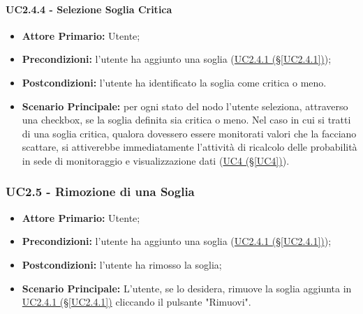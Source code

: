 \paragraph{UC2.4.4 - Selezione Soglia Critica}\label{UC2.4.4}
\begin{itemize}
	\item \textbf{Attore Primario:} Utente;
	\item \textbf{Precondizioni:} l'utente ha aggiunto una soglia (\hyperref[UC2.4.1]{UC2.4.1 (§\ref*{UC2.4.1})});
	\item \textbf{Postcondizioni:} l'utente ha identificato la soglia come critica o meno.
	\item \textbf{Scenario Principale:} per ogni stato del nodo l'utente seleziona, attraverso una checkbox\glossario, se la soglia definita sia critica o meno. Nel caso in cui si tratti di una soglia critica, qualora dovessero essere monitorati valori che la facciano scattare, si attiverebbe immediatamente l'attività di ricalcolo delle probabilità in sede di monitoraggio e visualizzazione dati (\hyperref[UC4]{UC4 (§\ref*{UC4})}).
\end{itemize}

\pagebreak

\subsubsection{UC2.5 - Rimozione di una Soglia}\label{UC2.5}
\begin{itemize}
	\item \textbf{Attore Primario:} Utente;
	\item \textbf{Precondizioni:} l'utente ha aggiunto una soglia (\hyperref[UC2.4.1]{UC2.4.1 (§\ref*{UC2.4.1})});
	\item \textbf{Postcondizioni:} l'utente ha rimosso la soglia;
	\item \textbf{Scenario Principale:} L'utente, se lo desidera, rimuove la soglia aggiunta in \hyperref[UC2.4.1]{UC2.4.1 (§\ref*{UC2.4.1})} cliccando il pulsante "Rimuovi".
\end{itemize}

